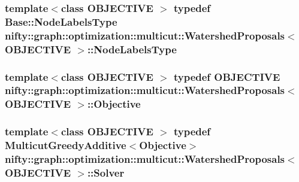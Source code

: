 \subsubsection[{Node\+Labels\+Type}]{\setlength{\rightskip}{0pt plus 5cm}template$<$class O\+B\+J\+E\+C\+T\+I\+V\+E $>$ typedef {\bf Base\+::\+Node\+Labels\+Type} {\bf nifty\+::graph\+::optimization\+::multicut\+::\+Watershed\+Proposals}$<$ O\+B\+J\+E\+C\+T\+I\+V\+E $>$\+::{\bf Node\+Labels\+Type}}\label{classnifty_1_1graph_1_1optimization_1_1multicut_1_1WatershedProposals_a73c2ef9e4f709718cd0ce6c6349a559b}
\hypertarget{classnifty_1_1graph_1_1optimization_1_1multicut_1_1WatershedProposals_ab718f52fd4c86362784d507794123a77}{}
\subsubsection[{Objective}]{\setlength{\rightskip}{0pt plus 5cm}template$<$class O\+B\+J\+E\+C\+T\+I\+V\+E $>$ typedef O\+B\+J\+E\+C\+T\+I\+V\+E {\bf nifty\+::graph\+::optimization\+::multicut\+::\+Watershed\+Proposals}$<$ O\+B\+J\+E\+C\+T\+I\+V\+E $>$\+::{\bf Objective}}\label{classnifty_1_1graph_1_1optimization_1_1multicut_1_1WatershedProposals_ab718f52fd4c86362784d507794123a77}
\hypertarget{classnifty_1_1graph_1_1optimization_1_1multicut_1_1WatershedProposals_a1be6a8728eb5896d77798bea92e7840e}{}
\subsubsection[{Solver}]{\setlength{\rightskip}{0pt plus 5cm}template$<$class O\+B\+J\+E\+C\+T\+I\+V\+E $>$ typedef {\bf Multicut\+Greedy\+Additive}$<${\bf Objective}$>$ {\bf nifty\+::graph\+::optimization\+::multicut\+::\+Watershed\+Proposals}$<$ O\+B\+J\+E\+C\+T\+I\+V\+E $>$\+::{\bf Solver}}\label{classnifty_1_1graph_1_1optimization_1_1multicut_1_1WatershedProposals_a1be6a8728eb5896d77798bea92e7840e}
\hypertarget{classnifty_1_1graph_1_1optimization_1_1multicut_1_1WatershedProposals_a47d856b6946598de4414fe0c84bcf368}{}
